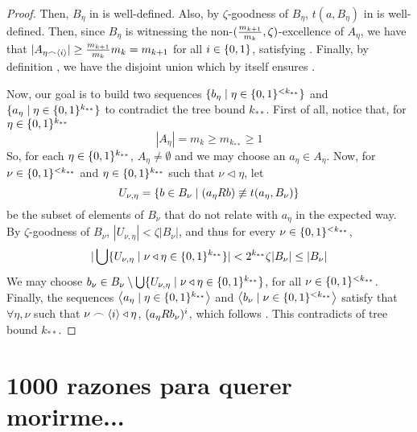 \begin{proof}
        Then, $B_\eta$ in  is well-defined.
        Also, by $\zeta$-goodness of $B_\eta$, $t(a, B_\eta)$ in  is well-defined.
        Then, since $B_\eta$ is witnessing the non-$( \frac{m_{k+1}}{m_{k}}, \zeta )$-excellence of $A_\eta$,
        we have that $|A_{\eta \frown \left< i \right>}| \geq \frac{m_{k+1}}{m_k} m_{k} = m_{k+1}$ for all
        $i \in \{ 0,1 \}$, satisfying .
        Finally, by definition , we have the disjoint union
         which by itself
        ensures .

        Now, our goal is to build two sequences $\{ b_\eta \mid \eta \in \{ 0,1 \}^{<k_{**}} \}$ and
        $\{ a_\eta \mid \eta \in \{ 0,1 \}^{k_{**}} \}$ to contradict the tree bound $k_{**}$.
        First of all, notice that, for $\eta \in \{ 0,1 \}^{k_{**}}$
        \[
            |A_\eta| = m_k \geq m_{k_{**}} \geq 1
        \]
        So, for each $\eta \in \{ 0,1 \}^{k_{**}}$, $A_\eta \neq \emptyset$ and we may choose an $a_\eta \in A_\eta$.
        Now, for $\nu \in \{ 0,1 \}^{<k_{**}}$ and $\eta \in \{ 0,1 \}^{k_{**}}$ such that $\nu \triangleleft \eta$, let
        \[
            U_{\nu,\eta} = \{ b \in B_\nu \mid (a_\eta R b) \not\equiv t(a_\eta, B_\nu) \}
        \]
        be the subset of elements of $B_\nu$ that do not relate with $a_\eta$ in the expected way.
        By $\zeta$-goodness of $B_\nu$, $|U_{\nu, \eta}| < \zeta |B_\nu|$, and thus for every $\nu \in \{ 0,1 \}^{<k_{**}}$,
        \[
            | \bigcup\{  U_{\nu,\eta} \mid \nu \triangleleft \eta \in \{ 0,1 \}^{k_{**}} \} | <
            2^{k_{**}} \zeta |B_\nu| \leq |B_\nu|
        \]
        We may choose $b_\nu \in B_\nu \setminus \bigcup\{ U_{\nu,\eta} \mid \nu \triangleleft \eta \in \{ 0,1 \}^{k_{**}} \}$,
        for all $\nu \in \{ 0,1 \}^{<k_{**}}$.
        Finally, the sequences $\left< a_\eta \mid \eta \in \{ 0,1 \}^{k_{**}} \right>$ and
        $\left< b_\nu \mid \nu \in \{ 0,1 \}^{<k_{**}} \right>$ satisfy that $\forall \eta, \nu$ such that
        $\nu \frown \left< i \right> \triangleleft \eta$, $( a_\eta R b_\nu )^i$, which follows
        .
        This contradicts  of tree bound $k_{**}$.
    \end{proof}

\vfill\newpage \section{1000 razones para querer morirme...} \label{sec:appendix_1000_razones}